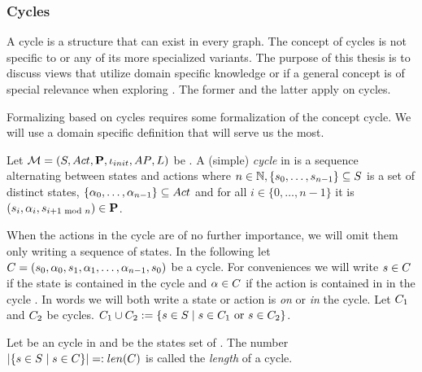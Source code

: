 \documentclass[preview]{standalone}
\begin{document}

\subsubsection{Cycles}
A cycle is a structure that can exist in every graph. The concept of cycles is not specific to \chgphsN or any of its more specialized variants. The purpose of this thesis is to discuss views that utilize domain specific knowledge or if a general concept is of special relevance when exploring \achgphN. The former and the latter apply on cycles.

Formalizing \viewsN based on cycles requires some formalization of the concept cycle. We will use a domain specific definition that will serve us the most.

\begin{definition}
	Let ${{{\mathcal{M}}}} = {{({S}, {Act}, {\textbf{P}}, {\iota_{init}}, {AP}, {L})}}$ be \achgphN. A (simple) \emph{cycle} \cycle in \chgph is a sequence \cyclesecfull alternating between states and actions where $n \in {\mathbb{N}}, \{{s}_0, \dots, {s}_{n-1}\} \subseteq {S}$ is a set of distinct states,  $\{{\alpha}_0, \dots, {\alpha}_{n-1}\} \subseteq {Act}$ and for all $i \in \{0, \dots, n-1\}$ it is $({s}_i,{\alpha}_i, {s}_{i+1 \text{ mod }n}) \in {\ensuremath{{\textbf{P}}}}$.
\end{definition}

When the actions in the cycle are of no further importance, we will omit them only writing a sequence of states. In the following let ${C} = {({s}_0, {\alpha}_0, {s}_1, {\alpha}_1, \dots, {\alpha}_{n-1}, {s}_0)}$ be a cycle. For conveniences we will write ${s} \in {C}$ if the state is contained in the cycle \cycle and ${\alpha} \in {C}$ if the action is contained in in the cycle \cycle.  In words we will both write a state or action is \emph{on} or \emph{in} the cycle. Let ${C}_1$ and ${C}_2$ be cycles. ${C}_1 \cup {C}_2 := \{{s} \in {S} \mid {s} \in {C}_1 \text{ or } {s} \in {C}_2\}$.

\begin{definition}
	Let \cycle be an cycle in \chgph and \states be the states set of \chgph. The number $|\{{s} \in {S} \mid {s} \in {C}\}| =: {len}({C})$ is called the \emph{length} of a cycle. 
\end{definition}
\end{document}
